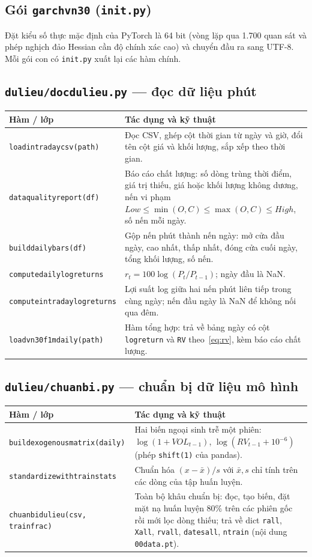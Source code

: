\documentclass[11pt,a4paper]{article}
\renewcommand{\_}{\gachduoi\allowbreak}
\newcommand{\tep}[1]{\texttt{#1}}
\newcommand{\ham}[1]{\texttt{#1}}
\begin{document}
\newcommand{\bangham}[1]{%
\begin{longtable}{@{}>{\raggedright\arraybackslash}p{0.30\textwidth}>{\raggedright\arraybackslash}p{0.65\textwidth}@{}}
\toprule \textbf{Hàm / lớp} & \textbf{Tác dụng và kỹ thuật} \\ \midrule \endhead
#1
\bottomrule
\end{longtable}}

\subsection{Gói \tep{garch\_vn30} (\tep{\_\_init\_\_.py})}
Đặt kiểu số thực mặc định của PyTorch là 64 bit (vòng lặp qua 1.700 quan sát và phép nghịch đảo Hessian cần độ chính xác cao) và chuyển đầu ra sang UTF-8. Mỗi gói con có \tep{\_\_init\_\_.py} xuất lại các hàm chính.

\subsection{\tep{du\_lieu/doc\_du\_lieu.py} — đọc dữ liệu phút}
\bangham{%
\ham{load\_intraday\_csv(path)} & Đọc CSV, ghép cột thời gian từ ngày và giờ, đổi tên cột giá và khối lượng, sắp xếp theo thời gian. \\
\ham{data\_quality\_report(df)} & Báo cáo chất lượng: số dòng trùng thời điểm, giá trị thiếu, giá hoặc khối lượng không dương, nến vi phạm $Low\le\min(O,C)\le\max(O,C)\le High$, số nến mỗi ngày. \\
\ham{build\_daily\_bars(df)} & Gộp nến phút thành nến ngày: mở cửa đầu ngày, cao nhất, thấp nhất, đóng cửa cuối ngày, tổng khối lượng, số nến. \\
\ham{compute\_daily\_log\_returns} & $r_t=100\log(P_t/P_{t-1})$; ngày đầu là NaN. \\
\ham{compute\_intraday\_log\_returns} & Lợi suất log giữa hai nến phút liên tiếp trong cùng ngày; nến đầu ngày là NaN để không nối qua đêm. \\
\ham{load\_vn30f1m\_daily(path)} & Hàm tổng hợp: trả về bảng ngày có cột \tep{log\_return} và \tep{RV} theo~\eqref{eq:rv}, kèm báo cáo chất lượng. \\}

\subsection{\tep{du\_lieu/chuan\_bi.py} — chuẩn bị dữ liệu mô hình}
\bangham{%
\ham{build\_exogenous\_matrix(daily)} & Hai biến ngoại sinh trễ một phiên: $\log(1+VOL_{t-1})$, $\log(RV_{t-1}+10^{-6})$ (phép \tep{shift(1)} của pandas). \\
\ham{standardize\_with\_train\_stats} & Chuẩn hóa $(x-\bar x)/s$ với $\bar x,s$ chỉ tính trên các dòng của tập huấn luyện. \\
\ham{chuan\_bi\_du\_lieu(csv, train\_frac)} & Toàn bộ khâu chuẩn bị: đọc, tạo biến, đặt mặt nạ huấn luyện 80\% trên các phiên gốc rồi mới lọc dòng thiếu; trả về dict \tep{r\_all}, \tep{X\_all}, \tep{rv\_all}, \tep{dates\_all}, \tep{n\_train} (nội dung \tep{00\_data.pt}). \\}
\end{document}
